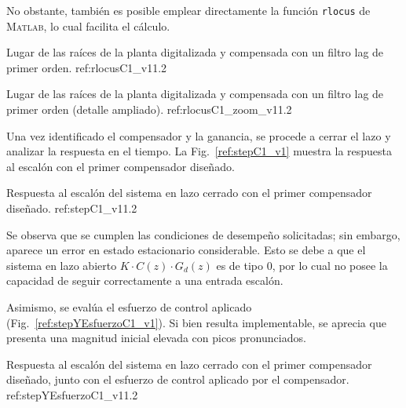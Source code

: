 No obstante, tambi\'en es posible emplear directamente la funci\'on \texttt{rlocus} de \textsc{Matlab}, lo cual facilita el c\'alculo.  

{Lugar de las ra\'ices de la planta digitalizada y compensada con un filtro lag de primer orden.}
{ref:rlocusC1_v1}{1.2}

{Lugar de las ra\'ices de la planta digitalizada y compensada con un filtro lag de primer orden (detalle ampliado).}
{ref:rlocusC1_zoom_v1}{1.2}

Una vez identificado el compensador y la ganancia, se procede a cerrar el lazo y analizar la respuesta en el tiempo. La Fig.~\ref{ref:stepC1_v1} muestra la respuesta al escal\'on con el primer compensador dise\~nado.  

{Respuesta al escal\'on del sistema en lazo cerrado con el primer compensador dise\~nado.}
{ref:stepC1_v1}{1.2}

Se observa que se cumplen las condiciones de desempe\~no solicitadas; sin embargo, aparece un error en estado estacionario considerable. Esto se debe a que el sistema en lazo abierto $K \cdot C(z) \cdot G_d(z)$ es de tipo 0, por lo cual no posee la capacidad de seguir correctamente a una entrada escal\'on.  

Asimismo, se eval\'ua el esfuerzo de control aplicado (Fig.~\ref{ref:stepYEsfuerzoC1_v1}). Si bien resulta implementable, se aprecia que presenta una magnitud inicial elevada con picos pronunciados.  

{Respuesta al escal\'on del sistema en lazo cerrado con el primer compensador dise\~nado, junto con el esfuerzo de control aplicado por el compensador.}
{ref:stepYEsfuerzoC1_v1}{1.2}


